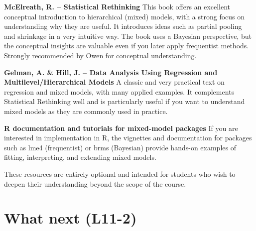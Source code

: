 \documentclass[
  letterpaper,
  8pt,
  a4paper]{book}
\begin{document}
\textbf{McElreath, R. -- Statistical Rethinking} This book offers an
excellent conceptual introduction to hierarchical (mixed) models, with a
strong focus on understanding why they are useful. It introduces ideas
such as partial pooling and shrinkage in a very intuitive way. The book
uses a Bayesian perspective, but the conceptual insights are valuable
even if you later apply frequentist methods. Strongly recommended by
Owen for conceptual understanding.

\textbf{Gelman, A. \& Hill, J. -- Data Analysis Using Regression and
Multilevel/Hierarchical Models} A classic and very practical text on
regression and mixed models, with many applied examples. It complements
Statistical Rethinking well and is particularly useful if you want to
understand mixed models as they are commonly used in practice.

\textbf{R documentation and tutorials for mixed-model packages} If you
are interested in implementation in R, the vignettes and documentation
for packages such as lme4 (frequentist) or brms (Bayesian) provide
hands-on examples of fitting, interpreting, and extending mixed models.

These resources are entirely optional and intended for students who wish
to deepen their understanding beyond the scope of the course.


\chapter*{What next (L11-2)}\label{what-next-l11-2}

\end{document}

